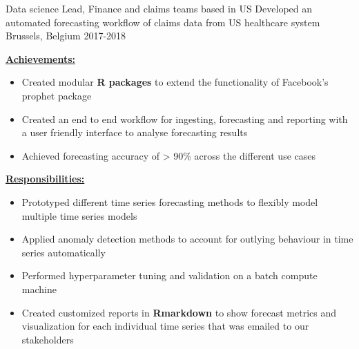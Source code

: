 \begin{cventries}
    \cventry
    {Data science Lead, Finance and claims teams based in US} %
    {Developed an automated forecasting workflow of claims data from US healthcare system} %
    {Brussels, Belgium} %
    {2017-2018} %
    {
    \begin{cvitems}
        \item {\underline{\textbf{Achievements:}}}
            \begin{itemize}
                \item Created modular \textbf{R packages} to extend the functionality of Facebook's prophet package 
                \item Created an end to end workflow for ingesting, forecasting and reporting with a user friendly interface to analyse forecasting results
                \item Achieved forecasting accuracy of > 90\% across the different use cases
            \end{itemize}
        \item {\underline{\textbf{Responsibilities:}}}
            \begin{itemize}
                \item {Prototyped different time series forecasting methods to flexibly model multiple time series models}
                \item {Applied anomaly detection methods to account for outlying behaviour in time series automatically}
                \item {Performed hyperparameter tuning and validation on a batch compute machine}
                \item {Created customized reports in \textbf{Rmarkdown} to show forecast metrics and visualization for each individual time series that was emailed to our stakeholders}
            \end{itemize}
    \end{cvitems}
    }

    \vspace{2mm}
        

\end{cventries}
